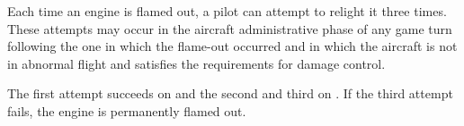 \begin{advancedrules}
{    }{

        Each time an engine is flamed out, a pilot can attempt to relight it three times. These attempts may occur in the aircraft administrative phase of any game turn following the one in which the flame-out occurred and in which the aircraft is not in abnormal flight and satisfies the requirements for damage control.

        The first attempt succeeds on  and the second and third on . If the third attempt fails, the engine is permanently flamed out.

    }


\end{advancedrules}
